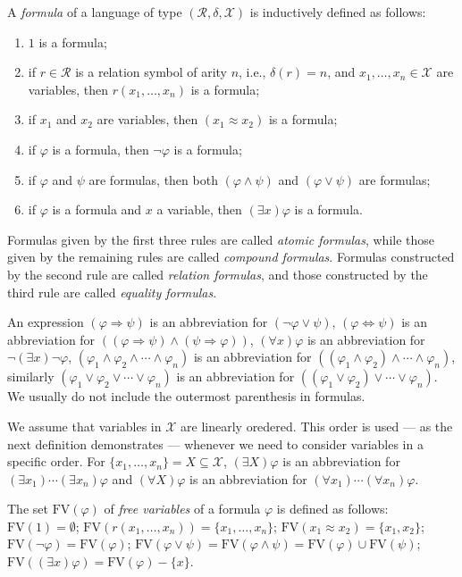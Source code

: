 \documentclass{lmcs}
\def\tu#1{( #1)}
\def\R{\mathcal R}
\def\X{\mathcal X}
\def\FV{\textrm{FV}}
\begin{document}
A \emph{formula} of a language of type $\tu{\R,\delta, \X}$ is inductively defined as follows:
\begin{enumerate}
\item $1$ is a formula;
\item if $r\in \R$ is a relation symbol of arity $n$, i.e., $\delta(r)=n$, and $x_1,\ldots,x_n\in\X$ are variables, then $r(x_1,\ldots,x_n)$ is a formula;
\item if $x_1$ and $x_2$ are variables, then $(x_1\approx x_2)$ is a formula;
\item if $\varphi$ is a formula, then $\neg\varphi$ is a formula;
\item if $\varphi$ and $\psi$ are formulas, then both $(\varphi\wedge\psi)$ and $(\varphi\vee\psi)$ are formulas;
\item if $\varphi$ is a formula and $x$ a variable, then $(\exists x)\varphi$ is a formula.
\end{enumerate}
Formulas given by the first three rules are called \emph{atomic formulas}, while those given by the remaining rules are called \emph{compound formulas}. Formulas constructed by the second rule are called \emph{relation formulas}, and those constructed by the third rule are called \emph{equality formulas}.

An expression $(\varphi\Rightarrow\psi)$ is an abbreviation for $(\neg\varphi\vee\psi)$, $(\varphi\Leftrightarrow\psi)$ is an abbreviation for $((\varphi\Rightarrow\psi)\wedge(\psi\Rightarrow\varphi))$, $(\forall x)\varphi$ is an abbreviation for $\neg(\exists x)\neg\varphi$, $(\varphi_1\wedge\varphi_2\wedge\cdots\wedge\varphi_n)$ is an abbreviation for $((\varphi_1\wedge\varphi_2)\wedge\cdots\wedge\varphi_n)$, similarly $(\varphi_1\vee\varphi_2\vee\cdots\vee\varphi_n)$ is an abbreviation for $((\varphi_1\vee\varphi_2)\vee\cdots\vee\varphi_n)$. We usually do not include the outermost parenthesis in formulas.

We assume that variables in $\X$ are linearly oredered. This order is used --- as the next definition demonstrates --- whenever we need to consider  variables in a specific order.  For $\{x_1,\ldots,x_n\}=X\subseteq \mathcal X$, $(\exists X)\varphi$ is an abbreviation for $(\exists x_1)\cdots(\exists x_n)\varphi$ and $(\forall X)\varphi$ is an abbreviation for $(\forall x_1)\cdots(\forall x_n)\varphi$. 

The set $\FV(\varphi)$ of \emph{free variables} of a formula $\varphi$ is defined as follows: $\FV(1)=\emptyset$; $\FV(r(x_1,\ldots,x_n))=\{x_1,\ldots,x_n\}$; $\FV(x_1\approx x_2)=\{x_1,x_2\}$;  $\FV(\neg\varphi)=\FV(\varphi)$; $\FV(\varphi\vee\psi)=\FV(\varphi\wedge\psi)=\FV(\varphi)\cup\FV(\psi)$; $\FV((\exists x)\varphi)=\FV(\varphi)-\{x\}$.
\end{document}
